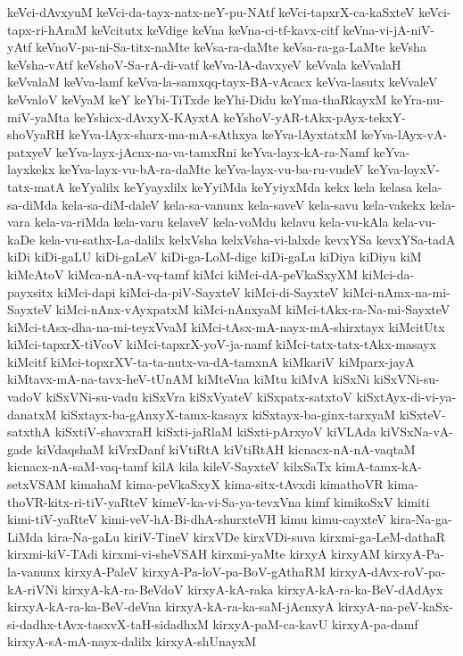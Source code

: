 {keVci-dAvxyuM
keVci-da-tayx-natx-neY-pu-NAtf
keVci-tapxrX-ca-kaSxteV
keVci-tapx-ri-hAraM
keVcitutx
keVdige
keVna
keVna-ci-tf-kavx-citf
keVna-vi-jA-niV-yAtf
keVnoV-pa-ni-Sa-titx-naMte
keVsa-ra-daMte
keVsa-ra-ga-LaMte
keVsha
keVsha-vAtf
keVshoV-Sa-rA-di-vatf
keVva-lA-davxyeV
keVvala
keVvalaH
keVvalaM
keVva-lamf
keVva-la-samxqq-tayx-BA-vAcacx
keVva-lasutx
keVvaleV
keVvaloV
keVyaM
keY
keYbi-TiTxde
keYhi-Didu
keYma-thaRkayxM
keYra-nu-miV-yaMta
keYshicx-dAvxyX-KAyxtA
keYshoV-yAR-tAkx-pAyx-tekxY-shoVyaRH
keYva-lAyx-sharx-ma-mA-sAthxya
keYva-lAyxtatxM
keYva-lAyx-vA-patxyeV
keYva-layx-jAcnx-na-va-tamxRni
keYva-layx-kA-ra-Namf
keYva-layxkekx
keYva-layx-vu-bA-ra-daMte
keYva-layx-vu-ba-ru-vudeV
keYva-loyxV-tatx-matA
keYyalilx
keYyayxlilx
keYyiMda
keYyiyxMda
kekx
kela
kelasa
kela-sa-diMda
kela-sa-diM-daleV
kela-sa-vanunx
kela-saveV
kela-savu
kela-vakekx
kela-vara
kela-va-riMda
kela-varu
kelaveV
kela-voMdu
kelavu
kela-vu-kAla
kela-vu-kaDe
kela-vu-sathx-La-dalilx
kelxVsha
kelxVsha-vi-lalxde
kevxYSa
kevxYSa-tadA
kiDi
kiDi-gaLU
kiDi-gaLeV
kiDi-ga-LoM-dige
kiDi-gaLu
kiDiya
kiDiyu
kiM
kiMcAtoV
kiMca-nA-nA-vq-tamf
kiMci
kiMci-dA-peVkaSxyXM
kiMci-da-payxsitx
kiMci-dapi
kiMci-da-piV-SayxteV
kiMci-di-SayxteV
kiMci-nAmx-na-mi-SayxteV
kiMci-nAnx-vAyxpatxM
kiMci-nAnxyaM
kiMci-tAkx-ra-Na-mi-SayxteV
kiMci-tAsx-dha-na-mi-teyxVvaM
kiMci-tAsx-mA-nayx-mA-shirxtayx
kiMcitUtx
kiMci-tapxrX-tiVcoV
kiMci-tapxrX-yoV-ja-namf
kiMci-tatx-tatx-tAkx-masayx
kiMcitf
kiMci-topxrXV-ta-ta-nutx-va-dA-tamxnA
kiMkariV
kiMparx-jayA
kiMtavx-mA-na-tavx-heV-tUnAM
kiMteVna
kiMtu
kiMvA
kiSxNi
kiSxVNi-su-vadoV
kiSxVNi-su-vadu
kiSxVra
kiSxVyateV
kiSxpatx-satxtoV
kiSxtAyx-di-vi-ya-danatxM
kiSxtayx-ba-gAnxyX-tamx-kasayx
kiSxtayx-ba-ginx-tarxyaM
kiSxteV-satxthA
kiSxtiV-shavxraH
kiSxti-jaRlaM
kiSxti-pArxyoV
kiVLAda
kiVSxNa-vA-gade
kiVdaqshaM
kiVrxDanf
kiVtiRtA
kiVtiRtAH
kicnacx-nA-nA-vaqtaM
kicnacx-nA-saM-vaq-tamf
kilA
kila
kileV-SayxteV
kilxSaTx
kimA-tamx-kA-setxVSAM
kimahaM
kima-peVkaSxyX
kima-sitx-tAvxdi
kimathoVR
kima-thoVR-kitx-ri-tiV-yaRteV
kimeV-ka-vi-Sa-ya-tevxVna
kimf
kimikoSxV
kimiti
kimi-tiV-yaRteV
kimi-veV-hA-Bi-dhA-shurxteVH
kimu
kimu-cayxteV
kira-Na-ga-LiMda
kira-Na-gaLu
kiriV-TineV
kirxVDe
kirxVDi-suva
kirxmi-ga-LeM-dathaR
kirxmi-kiV-TAdi
kirxmi-vi-sheVSAH
kirxmi-yaMte
kirxyA
kirxyAM
kirxyA-Pa-la-vanunx
kirxyA-PaleV
kirxyA-Pa-loV-pa-BoV-gAthaRM
kirxyA-dAvx-roV-pa-kA-riVNi
kirxyA-kA-ra-BeVdoV
kirxyA-kA-raka
kirxyA-kA-ra-ka-BeV-dAdAyx
kirxyA-kA-ra-ka-BeV-deVna
kirxyA-kA-ra-ka-saM-jAcnxyA
kirxyA-na-peV-kaSx-si-dadhx-tAvx-tasxvX-taH-sidadhxM
kirxyA-paM-ca-kavU
kirxyA-pa-damf
kirxyA-sA-mA-nayx-dalilx
kirxyA-shUnayxM
}
